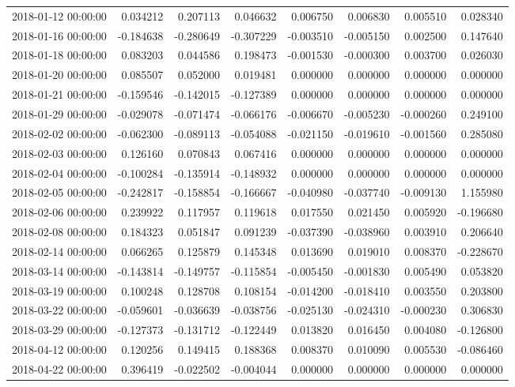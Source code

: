 \begin{tabular}{lrrrrrrr}
2018-01-12 00:00:00 & 0.034212 & 0.207113 & 0.046632 & 0.006750 & 0.006830 & 0.005510 & 0.028340 \\
2018-01-16 00:00:00 & -0.184638 & -0.280649 & -0.307229 & -0.003510 & -0.005150 & 0.002500 & 0.147640 \\
2018-01-18 00:00:00 & 0.083203 & 0.044586 & 0.198473 & -0.001530 & -0.000300 & 0.003700 & 0.026030 \\
2018-01-20 00:00:00 & 0.085507 & 0.052000 & 0.019481 & 0.000000 & 0.000000 & 0.000000 & 0.000000 \\
2018-01-21 00:00:00 & -0.159546 & -0.142015 & -0.127389 & 0.000000 & 0.000000 & 0.000000 & 0.000000 \\
2018-01-29 00:00:00 & -0.029078 & -0.071474 & -0.066176 & -0.006670 & -0.005230 & -0.000260 & 0.249100 \\
2018-02-02 00:00:00 & -0.062300 & -0.089113 & -0.054088 & -0.021150 & -0.019610 & -0.001560 & 0.285080 \\
2018-02-03 00:00:00 & 0.126160 & 0.070843 & 0.067416 & 0.000000 & 0.000000 & 0.000000 & 0.000000 \\
2018-02-04 00:00:00 & -0.100284 & -0.135914 & -0.148932 & 0.000000 & 0.000000 & 0.000000 & 0.000000 \\
2018-02-05 00:00:00 & -0.242817 & -0.158854 & -0.166667 & -0.040980 & -0.037740 & -0.009130 & 1.155980 \\
2018-02-06 00:00:00 & 0.239922 & 0.117957 & 0.119618 & 0.017550 & 0.021450 & 0.005920 & -0.196680 \\
2018-02-08 00:00:00 & 0.184323 & 0.051847 & 0.091239 & -0.037390 & -0.038960 & 0.003910 & 0.206640 \\
2018-02-14 00:00:00 & 0.066265 & 0.125879 & 0.145348 & 0.013690 & 0.019010 & 0.008370 & -0.228670 \\
2018-03-14 00:00:00 & -0.143814 & -0.149757 & -0.115854 & -0.005450 & -0.001830 & 0.005490 & 0.053820 \\
2018-03-19 00:00:00 & 0.100248 & 0.128708 & 0.108154 & -0.014200 & -0.018410 & 0.003550 & 0.203800 \\
2018-03-22 00:00:00 & -0.059601 & -0.036639 & -0.038756 & -0.025130 & -0.024310 & -0.000230 & 0.306830 \\
2018-03-29 00:00:00 & -0.127373 & -0.131712 & -0.122449 & 0.013820 & 0.016450 & 0.004080 & -0.126800 \\
2018-04-12 00:00:00 & 0.120256 & 0.149415 & 0.188368 & 0.008370 & 0.010090 & 0.005530 & -0.086460 \\
2018-04-22 00:00:00 & 0.396419 & -0.022502 & -0.004044 & 0.000000 & 0.000000 & 0.000000 & 0.000000 \\

\end{tabular}
